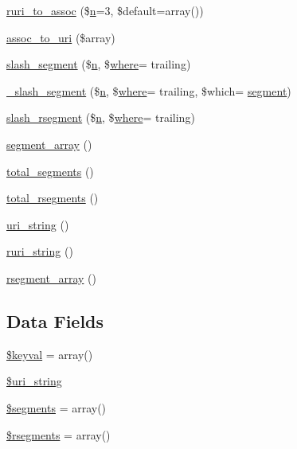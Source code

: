 \begin{DoxyCompactItemize}
\item 
\hyperlink{class_c_i___u_r_i_a3f375a2026349f1fce7915966eba6d5b}{ruri\+\_\+to\+\_\+assoc} (\$\hyperlink{fullpage_2plugin_8min_8js_ab767a859d1217315f42c9bb52fc648dc}{n}=3, \$default=array())
\item 
\hyperlink{class_c_i___u_r_i_a5c17149885c92fef1ed7f191f14a3f4d}{assoc\+\_\+to\+\_\+uri} (\$array)
\item 
\hyperlink{class_c_i___u_r_i_ac16fc32f9085c8ccf4d8eeae78765ae8}{slash\+\_\+segment} (\$\hyperlink{fullpage_2plugin_8min_8js_ab767a859d1217315f42c9bb52fc648dc}{n}, \$\hyperlink{_chart_8_core_8js_a2cd0517fad42cd949966517e5f2b302b}{where}= \textquotesingle{}trailing\textquotesingle{})
\item 
\hyperlink{class_c_i___u_r_i_aeb479c7fb188fad2720246af4827ea9a}{\+\_\+slash\+\_\+segment} (\$\hyperlink{fullpage_2plugin_8min_8js_ab767a859d1217315f42c9bb52fc648dc}{n}, \$\hyperlink{_chart_8_core_8js_a2cd0517fad42cd949966517e5f2b302b}{where}= \textquotesingle{}trailing\textquotesingle{}, \$which= \textquotesingle{}\hyperlink{class_c_i___u_r_i_a6f0bc9309bced907b54cf2178b359b9c}{segment}\textquotesingle{})
\item 
\hyperlink{class_c_i___u_r_i_a644ee9ec883346bab8ba8819ee3ebf98}{slash\+\_\+rsegment} (\$\hyperlink{fullpage_2plugin_8min_8js_ab767a859d1217315f42c9bb52fc648dc}{n}, \$\hyperlink{_chart_8_core_8js_a2cd0517fad42cd949966517e5f2b302b}{where}= \textquotesingle{}trailing\textquotesingle{})
\item 
\hyperlink{class_c_i___u_r_i_ac0db37475b7a41e156f2e9375a2b7cc6}{segment\+\_\+array} ()
\item 
\hyperlink{class_c_i___u_r_i_a5805c40e1c916e7b00b49f131765ac1c}{total\+\_\+segments} ()
\item 
\hyperlink{class_c_i___u_r_i_aead39329dc096b94eef0955fdcdd635f}{total\+\_\+rsegments} ()
\item 
\hyperlink{class_c_i___u_r_i_ac7a3f945c14cc37f89b6d9d1c7a037a4}{uri\+\_\+string} ()
\item 
\hyperlink{class_c_i___u_r_i_a53a97a8b68f500980b84e3b060400221}{ruri\+\_\+string} ()
\item 
\hyperlink{class_c_i___u_r_i_aaac2da0a6641a4a874a178442eb99624}{rsegment\+\_\+array} ()
\end{DoxyCompactItemize}
\subsection*{Data Fields}
\begin{DoxyCompactItemize}
\item 
\hyperlink{class_c_i___u_r_i_ae15942155aae4760439f552ad1fc3c34}{\$keyval} = array()
\item 
\hyperlink{class_c_i___u_r_i_ab908b3e655463a05e8a646c965ca4e53}{\$uri\+\_\+string}
\item 
\hyperlink{class_c_i___u_r_i_a8d7f597e2b6cf2aaef663822d1b96a82}{\$segments} = array()
\item 
\hyperlink{class_c_i___u_r_i_abf60189292b5fda02cdf36e5d7417a33}{\$rsegments} = array()
\end{DoxyCompactItemize}


